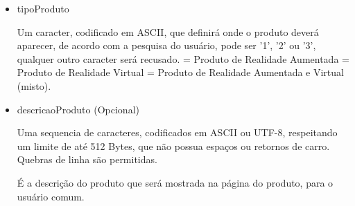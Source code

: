 \documentclass{article}
\begin{document}
\begin{itemize}
					\item{tipoProduto}
						\par Um caracter, codificado em ASCII, que definirá onde o produto deverá aparecer, de acordo com a pesquisa do usuário, pode ser '1', '2' ou '3', qualquer outro caracter será recusado.
						 = Produto de Realidade Aumentada
						 = Produto de Realidade Virtual
						 = Produto de Realidade Aumentada e Virtual (misto).
					\item{descricaoProduto} (Opcional)
						\par Uma sequencia de caracteres, codificados em ASCII ou UTF-8, respeitando um limite de até 512 Bytes, que não possua espaços ou retornos de carro. Quebras de linha são permitidas.
						\par É a descrição do produto que será mostrada na página do produto, para o usuário comum.
				\end{itemize}
\end{document}

